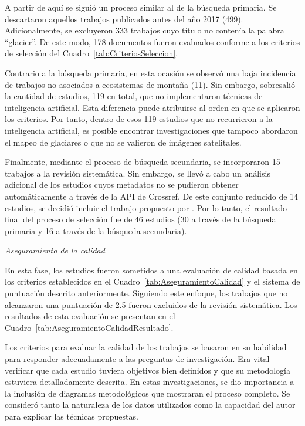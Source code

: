 A partir de aquí se siguió un proceso similar al de la búsqueda primaria. Se descartaron aquellos trabajos publicados antes del año 2017 (499). Adicionalmente, se excluyeron 333 trabajos cuyo título no contenía la palabra ``glacier''. De este modo, 178 documentos fueron evaluados conforme a los criterios de selección del Cuadro~\ref{tab:CriteriosSeleccion}.

Contrario a la búsqueda primaria, en esta ocasión se observó una baja incidencia de trabajos no asociados a ecosistemas de montaña (11). Sin embargo, sobresalió la cantidad de estudios, 119 en total, que no implementaron técnicas de inteligencia artificial. Esta diferencia puede atribuirse al orden en que se aplicaron los criterios. Por tanto, dentro de esos 119 estudios que no recurrieron a la inteligencia artificial, es posible encontrar investigaciones que tampoco abordaron el mapeo de glaciares o que no se valieron de imágenes satelitales.

Finalmente, mediante el proceso de búsqueda secundaria, se incorporaron 15 trabajos a la revisión sistemática. Sin embargo, se llevó a cabo un análisis adicional de los estudios cuyos metadatos no se pudieron obtener automáticamente a través de la API de Crossref. De este conjunto reducido de 14 estudios, se decidió incluir el trabajo propuesto por . Por lo tanto, el resultado final del proceso de selección fue de 46 estudios (30 a través de la búsqueda primaria y 16 a través de la búsqueda secundaria).

\textit{Aseguramiento de la calidad}

En esta fase, los estudios fueron sometidos a una evaluación de calidad basada en los criterios establecidos en el Cuadro~\ref{tab:AseguramientoCalidad} y el sistema de puntuación descrito anteriormente. Siguiendo este enfoque, los trabajos que no alcanzaron una puntuación de 2.5 fueron excluidos de la revisión sistemática. Los resultados de esta evaluación se presentan en el Cuadro~\ref{tab:AseguramientoCalidadResultado}.

Los criterios para evaluar la calidad de los trabajos se basaron en su habilidad para responder adecuadamente a las preguntas de investigación. Era vital verificar que cada estudio tuviera objetivos bien definidos y que su metodología estuviera detalladamente descrita. En estas investigaciones, se dio importancia a la inclusión de diagramas metodológicos que mostraran el proceso completo. Se consideró tanto la naturaleza de los datos utilizados como la capacidad del autor para explicar las técnicas propuestas.

